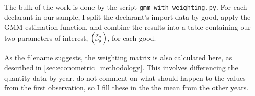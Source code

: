 \documentclass[12pt,a4paper]{article}                      %
\begin{document}
The bulk of the work is done by the script \texttt{gmm\_with\_weighting.py}.  For each declarant in our sample, I split the declarant's import data by good, apply the GMM estimation function, and combine the results into a table containing our two parameters of interest, $\Bigl(\negthinspace\begin{smallmatrix}\sigma_g\\\omega_g\end{smallmatrix}\Bigr)$, for each good.

As the filename suggests, the weighting matrix is also calculated here, as described in \ref{sec:econometric_methodology}.  This involves differencing the quantity data by year.  \cite{broda_weinstein_2006_globalization_gains} do not comment on what should happen to the values from the first observation, so I fill these in the the mean from the other years.
\end{document}
